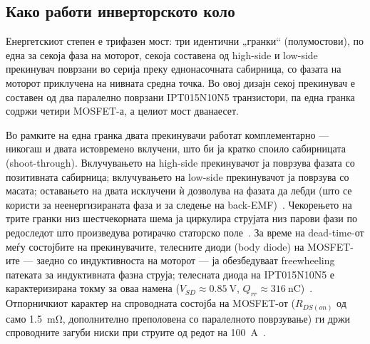 \documentclass[journal,onecolumn,11pt]{IEEEtran}
\begin{document}
\subsection{Како работи инверторското коло}
Енергетскиот степен е трифазен мост: три идентични „гранки“ (полумостови), по една
за секоја фаза на моторот, секоја составена од high-side и low-side прекинувач
поврзани во серија преку еднонасочната сабирница, со фазата на моторот приклучена
на нивната средна точка. Во овој дизајн секој прекинувач е составен од два паралелно
поврзани IPT015N10N5 транзистори, па една гранка содржи четири MOSFET-а, а целиот
мост дванаесет.

Во рамките на една гранка двата прекинувачи работат комплементарно --- никогаш и
двата истовремено вклучени, што би ја кратко споило сабирницата (shoot-through).
Вклучувањето на high-side прекинувачот ја поврзува фазата со позитивната сабирница;
вклучувањето на low-side прекинувачот ја поврзува со масата; оставањето на двата
исклучени ѝ дозволува на фазата да лебди (што се користи за неенергизираната фаза и
за следење на back-EMF)~\cite{onsemi_bldc,nxp_backemf}. Чекорењето на трите гранки
низ шестчекорната шема ја циркулира струјата низ парови фази по редоследот што
произведува ротирачко статорско поле~\cite{onsemi_bldc}. За време на dead-time-от
меѓу состојбите на прекинувачите, телесните диоди (body diode) на MOSFET-ите ---
заедно со индуктивноста на моторот --- ја обезбедуваат freewheeling патеката за
индуктивната фазна струја; телесната диода на IPT015N10N5 е карактеризирана токму за
оваа намена ($V_{SD}\approx\SI{0.85}{\volt}$, $Q_{rr}\approx\SI{316}{\nano\coulomb}$)~\cite{ipt015ds}.
Отпорничкиот карактер на спроводната состојба на MOSFET-от ($R_{DS(on)}$ од само
\SI{1.5}{\milli\ohm}, дополнително преполовена со паралелното поврзување) ги држи
спроводните загуби ниски при струите од редот на \SI{100}{\ampere}~\cite{ipt015ds,balogh}.
\end{document}
